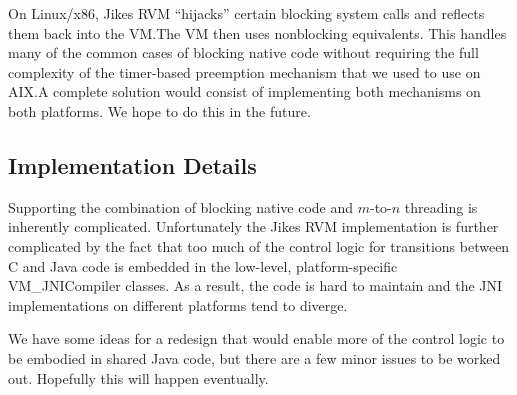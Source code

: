 On Linux/x86, Jikes RVM ``hijacks'' certain blocking system calls and
reflects them back into the VM.\@  The VM then uses nonblocking
equivalents. This handles many of the common cases of blocking native
code without requiring the full complexity of the timer-based
preemption mechanism that we used to use on AIX.\@  A complete
solution would consist of implementing both mechanisms on both
platforms.  We hope to do this in the future.

\subsection{Implementation Details}
Supporting the combination of blocking native code and $m$-to-$n$
threading is inherently complicated.  Unfortunately the Jikes RVM
implementation is further complicated by the fact that too much of the
control logic for transitions between C and Java code is embedded in
the low-level, platform-specific {VM\_JNICompiler} classes.  As a
result, the code is hard to maintain and the JNI implementations
on different platforms tend to diverge. 

We have some ideas for a redesign that would enable more of the
control logic to be embodied in shared Java code, but there are a few
minor issues to be worked out.  Hopefully this will happen eventually.
